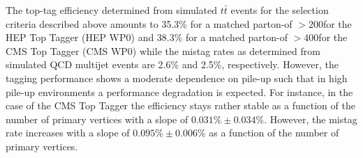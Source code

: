 The top-tag efficiency determined from simulated $t\bar{t}$ events for the selection criteria described above amounts to 35.3\% for a matched parton-\pt of $> 200$\gev for the HEP Top Tagger (HEP WP0) and 38.3\% for a matched parton-\pt of $> 400$\gev for the CMS Top Tagger (CMS WP0) while the mistag rates as determined from simulated QCD multijet events are 2.6\% and 2.5\%, respectively. However, the tagging performance shows a moderate dependence on pile-up such that in high pile-up environments a performance degradation is expected. For instance, in the case of the CMS Top Tagger the efficiency stays rather stable as a function of the number of primary vertices with a slope of $0.031\% \pm 0.034\%$. However, the mistag rate increases with a slope of $0.095\% \pm 0.006\%$ as a function of the number of primary vertices.      


